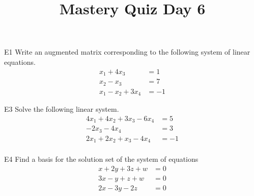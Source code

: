 \documentclass{sbgLAquiz}
\title{Mastery Quiz Day 6 }
\begin{document}
\begin{problem}{E1}
Write an augmented matrix corresponding to the following system of linear equations.
\begin{align*}
x_1+4x_3 &= 1 \\
x_2-x_3 &= 7 \\
x_1-x_2+3x_4 &= -1
\end{align*}
\end{problem}

\begin{problem}{E3}
Solve the following linear system.
\begin{align*}
4x_1+4x_2+3x_3-6x_4 &= 5 \\
-2x_3-4x_4 &= 3 \\
2x_1+2x_2+x_3-4x_4 &= -1 \\
\end{align*}
\end{problem}
\newpage

\begin{problem}{E4}
Find a basis for the solution set of the system of equations
\begin{align*}
x+2y+3z+w &= 0 \\
3x-y+z+w &= 0 \\
2x-3y-2z &= 0
\end{align*}
\end{problem}
\end{document}
